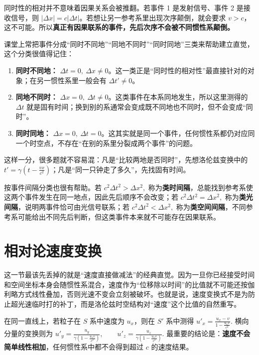 \documentclass[lang=cn,11pt]{elegantbook}
\begin{document}
\begin{remark}
同时性的相对并不意味着因果关系会被推翻。若事件 1 是发射信号、事件 2 是接收信号，则 \(|\Delta x|=c|\Delta t|\)。若想让另一参考系里出现次序颠倒，就会要求 \(v>c\)，这不可能。所以\textbf{真正有因果联系的事件，先后次序不会被不同惯性系颠倒。}
\end{remark}

\begin{remark}
课堂上常把事件分成“同时不同地”“同地不同时”“同时同地”三类来帮助建立直觉，这个分类很值得记住：
\begin{enumerate}
 \item \textbf{同时不同地：} \(\Delta t=0,\ \Delta x\neq 0\)。这一类正是“同时性的相对性”最直接针对的对象；在另一惯性系里一般会有 \(\Delta t'\neq 0\)。
 \item \textbf{同地不同时：} \(\Delta x=0,\ \Delta t\neq 0\)。这类事件在本系同地发生，所以这里测得的 \(\Delta t\) 就是固有时间；换到别的系通常会变成既不同地也不同时，但不会变成“同时”。
 \item \textbf{同时同地：} \(\Delta x=0,\ \Delta t=0\)。这其实就是同一个事件，任何惯性系都仍对应同一个时空点，不存在“在别的系里分裂成两个事件”的问题。
\end{enumerate}
这样一分，很多题就不容易混：凡是“比较两地是否同时”，先想洛伦兹变换中的 \(t'=\gamma\left(t-\frac{vx}{c^2}\right)\)；凡是“同一只钟走了多久”，先找固有时间。
\end{remark}

\begin{note}
按事件间隔分类也很有帮助。若
 \(c^2\Delta t^2>\Delta x^2,\) 
称为\textbf{类时间隔}，总能找到参考系使这两个事件发生在同一地点，因此先后顺序不会改变；若
 \(c^2\Delta t^2=\Delta x^2,\) 
称为\textbf{类光间隔}，说明两事件恰可由光信号联系；若
 \(c^2\Delta t^2<\Delta x^2,\) 
称为\textbf{类空间间隔}，不同参考系可能给出不同先后判断，但这类事件本来就不可能存在因果联系。
\end{note}

\section{相对论速度变换}

这一节最该先丢掉的就是“速度直接做减法”的经典直觉。因为一旦你已经接受时间和空间坐标本身会随惯性系混合，速度作为“位移除以时间”的比值就不可能还按伽利略方式线性叠加，否则光速不变会立刻被破坏。也就是说，速度变换式不是为防止超光速临时打的补丁，而是洛伦兹时空结构对“速度”这个比值的自然重写。

在同一直线上，若粒子在 \(S\) 系中速度为 \(u_x\)，则在 \(S'\) 系中测得
 \(u'_x=\frac{u_x-v}{1-\frac{u_xv}{c^2}}.\) 
横向分量的变换则为
 \(u'_y=\frac{u_y}{\gamma\left(1-\frac{u_xv}{c^2}\right)}, \qquad u'_z=\frac{u_z}{\gamma\left(1-\frac{u_xv}{c^2}\right)}.\) 
最重要的结论是：\textbf{速度不会简单线性相加}，任何惯性系中都不会得到超过 \(c\) 的速度结果。
\end{document}
